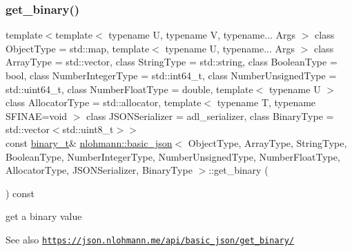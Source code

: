 \subsubsection{\texorpdfstring{get\+\_\+binary()}{get\_binary()}\hspace{0.1cm}{\footnotesize\ttfamily [2/2]}}
{\footnotesize\ttfamily template$<$template$<$ typename U, typename V, typename... Args $>$ class Object\+Type = std\+::map, template$<$ typename U, typename... Args $>$ class Array\+Type = std\+::vector, class String\+Type  = std\+::string, class Boolean\+Type  = bool, class Number\+Integer\+Type  = std\+::int64\+\_\+t, class Number\+Unsigned\+Type  = std\+::uint64\+\_\+t, class Number\+Float\+Type  = double, template$<$ typename U $>$ class Allocator\+Type = std\+::allocator, template$<$ typename T, typename S\+F\+I\+N\+A\+E=void $>$ class J\+S\+O\+N\+Serializer = adl\+\_\+serializer, class Binary\+Type  = std\+::vector$<$std\+::uint8\+\_\+t$>$$>$ \\
const \hyperlink{classnlohmann_1_1basic__json_ad6c955145bebde84d93991ffed7cd389}{binary\+\_\+t}\& \hyperlink{classnlohmann_1_1basic__json}{nlohmann\+::basic\+\_\+json}$<$ Object\+Type, Array\+Type, String\+Type, Boolean\+Type, Number\+Integer\+Type, Number\+Unsigned\+Type, Number\+Float\+Type, Allocator\+Type, J\+S\+O\+N\+Serializer, Binary\+Type $>$\+::get\+\_\+binary (\begin{DoxyParamCaption}{ }\end{DoxyParamCaption}) const\hspace{0.3cm}{\ttfamily [inline]}}



get a binary value 

\begin{DoxySeeAlso}{See also}
\href{https://json.nlohmann.me/api/basic_json/get_binary/}{\tt https\+://json.\+nlohmann.\+me/api/basic\+\_\+json/get\+\_\+binary/} 
\end{DoxySeeAlso}
\mbox{\label{classnlohmann_1_1basic__json_ac3698ce827dcd4f0c81455461709938d}} 
